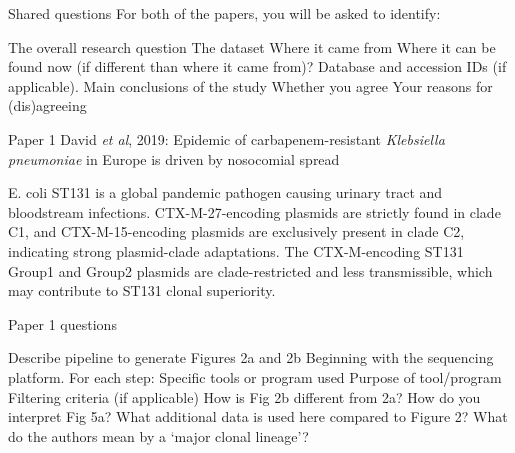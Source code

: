 \documentclass{beamer}
\begin{document}
\begin{frame}{Shared questions}
    For both of the papers, you will be asked to identify:
    \begin{outline}
        \1 The overall research question
        \1 The dataset
            \2 Where it came from
            \2 Where it can be found now (if different than where it came from)?
            \2 Database and accession IDs (if applicable).
        \1 Main conclusions of the study
            \2 Whether you agree
            \2 Your reasons for (dis)agreeing
    \end{outline}
\end{frame}

\begin{frame}{Paper 1}
    David \textit{et al}, 2019: Epidemic of carbapenem-resistant \textit{Klebsiella pneumoniae} in Europe is driven by nosocomial spread
    \begin{outline}
        \1 E. coli ST131 is a global pandemic pathogen causing urinary tract and bloodstream infections.
        \1 CTX-M-27-encoding plasmids are strictly found in clade C1, and CTX-M-15-encoding plasmids are exclusively present in clade C2, indicating strong plasmid-clade adaptations.
        \1 The CTX-M-encoding ST131 Group1 and Group2 plasmids are clade-restricted and less transmissible, which may contribute to ST131 clonal superiority.
    \end{outline}
\end{frame}

\begin{frame}{Paper 1 questions}
    \begin{outline}
        \1 Describe pipeline to generate Figures 2a and 2b
            \2 Beginning with the sequencing platform.
            \2 For each step:
                \3 Specific tools or program used
                \3 Purpose of tool/program
                \3 Filtering criteria (if applicable)
            \2 How is Fig 2b different from 2a?
        \1 How do you interpret Fig 5a? What additional data is used here compared to Figure 2?
        \1 What do the authors mean by a `major clonal lineage'?
    \end{outline}
\end{frame}
\end{document}
